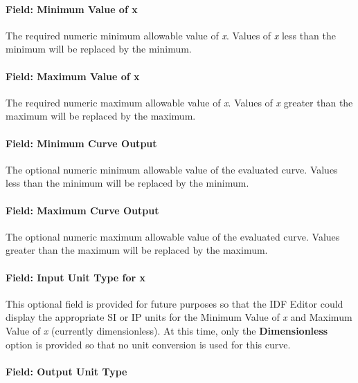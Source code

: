 \paragraph{Field: Minimum Value of x}\label{field-minimum-value-of-x-15}

The required numeric minimum allowable value of \emph{x}. Values of \emph{x} less than the minimum will be replaced by the minimum.

\paragraph{Field: Maximum Value of x}\label{field-maximum-value-of-x-16}

The required numeric maximum allowable value of \emph{x}. Values of \emph{x} greater than the maximum will be replaced by the maximum.

\paragraph{Field: Minimum Curve Output}\label{field-minimum-curve-output-15}

The optional numeric minimum allowable value of the evaluated curve. Values less than the minimum will be replaced by the minimum.

\paragraph{Field: Maximum Curve Output}\label{field-maximum-curve-output-14}

The optional numeric maximum allowable value of the evaluated curve. Values greater than the maximum will be replaced by the maximum.

\paragraph{Field: Input Unit Type for x}\label{field-input-unit-type-for-x-15}

This optional field is provided for future purposes so that the IDF Editor could display the appropriate SI or IP units for the Minimum Value of \emph{x} and Maximum Value of \emph{x} (currently dimensionless). At this time, only the \textbf{Dimensionless} option is provided so that no unit conversion is used for this curve.

\paragraph{Field: Output Unit Type}\label{field-output-unit-type-14}

